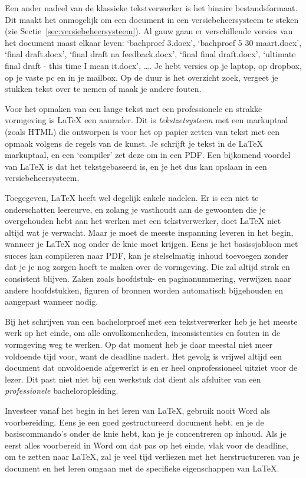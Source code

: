 Een ander nadeel van de klassieke tekstverwerker is het binaire bestandsformaat. Dit maakt het onmogelijk om een document in een versiebeheersysteem te steken (zie Sectie~\ref{sec:versiebeheersysteem}). Al gauw gaan er verschillende versies van het document naast elkaar leven: `bachproef 3.docx', `bachproef 5 30 maart.docx', `final draft.docx', `final draft na feedback.docx', `final final draft.docx', `ultimate final draft - this time I mean it.docx', \dots. Je hebt versies op je laptop, op dropbox, op je vaste pc en in je mailbox. Op de duur is het overzicht zoek, vergeet je stukken tekst over te nemen of maak je andere fouten.

Voor het opmaken van een lange tekst met een professionele en strakke vormgeving is {\LaTeX} een aanrader. Dit is \emph{tekstzetsysteem} met een markuptaal (zoals HTML) die ontworpen is voor het op papier zetten van tekst met een opmaak volgens de regels van de kunst. Je schrijft je tekst in de {\LaTeX} markuptaal, en een `compiler' zet deze om in een PDF. Een bijkomend voordel van {\LaTeX} is dat het tekstgebaseerd is, en je het dus kan opslaan in een versiebeheersysteem.

Toegegeven, {\LaTeX} heeft wel degelijk enkele nadelen. Er is een niet te onderschatten leercurve, en zolang je vasthoudt aan de gewoonten die je overgehouden hebt aan het werken met een tekstverwerker, doet {\LaTeX} niet altijd wat je verwacht. Maar je moet de meeste inspanning leveren in het begin, wanneer je {\LaTeX} nog onder de knie moet krijgen. Eens je het basissjabloon met succes kan compileren naar PDF, kan je stelselmatig inhoud toevoegen zonder dat je je nog zorgen hoeft te maken over de vormgeving. Die zal altijd strak en consistent blijven. Zaken zoals hoofdstuk- en paginanummering, verwijzen naar andere hoofdstukken, figuren of bronnen worden automatisch bijgehouden en aangepast wanneer nodig.

Bij het schrijven van een bachelorproef met een tekstverwerker heb je het mees\-te werk op het einde, om alle onvolkomenheden, inconsistenties en fouten in de vormgeving weg te werken. Op dat moment heb je daar meestal niet meer voldoende tijd voor, want de deadline nadert. Het gevolg is vrijwel altijd een document dat onvoldoende afgewerkt is en er heel onprofessioneel uitziet voor de lezer. Dit past niet niet bij een werkstuk dat dient als afsluiter van een \textit{professionele} bacheloropleiding.

Investeer vanaf het begin in het leren van {\LaTeX}, gebruik nooit Word als voorbereiding. Eens je een goed gestructureerd document hebt, en je de basiscommando's onder de knie hebt, kan je je concentreren op inhoud. Als je eerst alles voorbereid in Word om dat pas op het einde, vlak voor de deadline, om te zetten naar {\LaTeX}, zal je veel tijd verliezen met het herstructureren van je document en het leren omgaan met de specifieke eigenschappen van {\LaTeX}.

